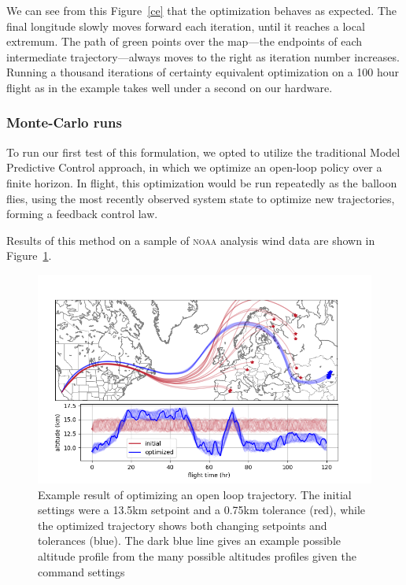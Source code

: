 \documentclass[11pt]{scrartcl} %
\begin{document}
We can see from this Figure~\ref{ce} that the optimization behaves as expected. The final longitude slowly moves forward each iteration, until it reaches a local extremum. The path of green points over the map---the endpoints of each intermediate trajectory---always moves to the right as iteration number increases. Running a thousand iterations of certainty equivalent optimization on a 100 hour flight as in the example takes well under a second on our hardware.

\subsubsection{Monte-Carlo runs}

To run our first test of this formulation, we opted to utilize the traditional Model Predictive Control approach, in which we optimize an open-loop policy over a finite horizon. In flight, this optimization would be run repeatedly as the balloon flies, using the most recently observed system state to optimize new trajectories, forming a feedback control law. 

Results of this method on a sample of \textsc{noaa} analysis wind data are shown in Figure~\ref{openloop}.
\begin{figure}[h]
\includegraphics[width=\linewidth]{datasheetfig.png}
\caption{Example result of optimizing an open loop trajectory. The initial settings were a 13.5km setpoint and a 0.75km tolerance (red), while the optimized trajectory shows both changing setpoints and tolerances (blue). The dark blue line gives an example possible altitude profile from the many possible altitudes profiles given the command settings}
\label{openloop}
\end{figure}
\end{document}

